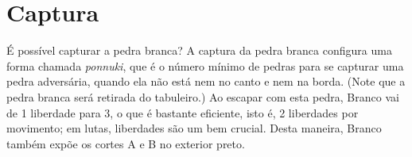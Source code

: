 \chapter{Captura}

\problemDiagrams%
  {É possível capturar a pedra branca?}
\answerDiagrams%
  {A captura da pedra branca configura uma forma chamada \emph{ponnuki}, que é o número mínimo de pedras para se capturar uma pedra adversária, quando ela não está nem no canto e nem na borda. (Note que a pedra branca será retirada do tabuleiro.)}%
  {Ao escapar com esta pedra, Branco vai de 1 liberdade para 3, o que é bastante eficiente, isto é, 2 liberdades por movimento; em lutas, liberdades são um bem crucial. Desta maneira, Branco também expõe os cortes \textsf{A} e \textsf{B} no exterior preto.}%
